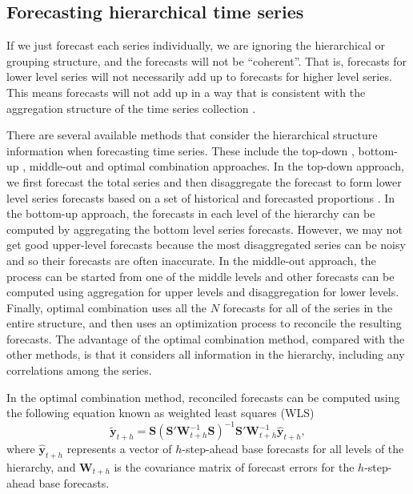 \documentclass[11pt,a4paper,]{article}
\begin{document}
\hypertarget{forecasting-hierarchical-time-series}{%
\subsection{Forecasting hierarchical time series}\label{forecasting-hierarchical-time-series}}

If we just forecast each series individually, we are ignoring the hierarchical or grouping structure, and the forecasts will not be ``coherent''. That is, forecasts for lower level series will not necessarily add up to forecasts for higher level series. This means forecasts will not add up in a way that is consistent with the aggregation structure of the time series collection \autocite{fpp2}.

There are several available methods that consider the hierarchical structure information when forecasting time series. These include the top-down \autocite{gross1990disaggregation,fliedner2001hierarchical}, bottom-up \autocite{kahn1998revisiting}, middle-out and optimal combination \autocite{hyndman2011optimal} approaches. In the top-down approach, we first forecast the total series and then disaggregate the forecast to form lower level series forecasts based on a set of historical and forecasted proportions \autocite[for details see][]{athanasopoulos2009hierarchical}. In the bottom-up approach, the forecasts in each level of the hierarchy can be computed by aggregating the bottom level series forecasts. However, we may not get good upper-level forecasts because the most disaggregated series can be noisy and so their forecasts are often inaccurate. In the middle-out approach, the process can be started from one of the middle levels and other forecasts can be computed using aggregation for upper levels and disaggregation for lower levels. Finally, optimal combination uses all the \(N\) forecasts for all of the series in the entire structure, and then uses an optimization process to reconcile the resulting forecasts. The advantage of the optimal combination method, compared with the other methods, is that it considers all information in the hierarchy, including any correlations among the series.

In the optimal combination method, reconciled forecasts can be computed using the following equation known as weighted least squares (WLS) \autocite{mint2018}
\begin{equation}\label{eq:mint}
  \tilde{\bm{y}}_{t+h}=\bm{S}(\bm{S}'\bm{W}_{t+h}^{-1}\bm{S})^{-1}\bm{S}'\bm{W}_{t+h}^{-1}\hat{\bm{y}}_{t+h},
\end{equation}
where \(\hat{\bm{y}}_{t+h}\) represents a vector of \(h\)-step-ahead base forecasts for all levels of the hierarchy, and \(\bm{W}_{t+h}\) is the covariance matrix of forecast errors for the \(h\)-step-ahead base forecasts.
\end{document}
